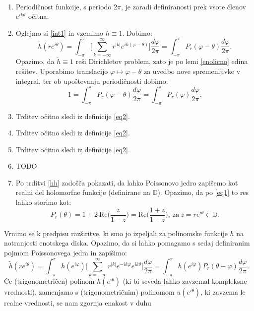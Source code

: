 \documentclass[mat1]{fmfdelo}
\begin{document}
    \begin{dokaz}
        $ $
        \begin{enumerate}
            \item Periodičnost funkcije, s periodo $2\pi$, je zaradi definiranosti prek vsote členov $e^{ik\theta}$ očitna. 
            \item Oglejmo si \ref{int1} in vzemimo $h \equiv 1$. Dobimo: 
            $$
                \widetilde{h}(r e^{i \theta}) = \int_{-\pi}^{\pi}{\bigg[\sum_{k=-\infty}^{\infty}{r^{|k|} e^{ik(\varphi - \theta)}}\bigg] \frac{d \varphi}{2 \pi}} = \int_{-\pi}^{\pi}{P_r(\varphi - \theta)\frac{d \varphi}{2 \pi}}. 
            $$
            Opazimo, da $\widetilde{h} \equiv 1$ reši Dirichletov problem, zato je po lemi \ref{enolicno} edina rešitev. Uporabimo translacijo $\varphi \mapsto \varphi - \theta$ za uvedbo nove spremenljivke v integral, ter ob upoštevanju periodičnosti dobimo:
            $$
                1 = \int_{-\pi}^{\pi}{P_r(\varphi - \theta)\frac{d \varphi}{2 \pi}} = \int_{-\pi}^{\pi}{P_r(\varphi)\frac{d \varphi}{2 \pi}}.
            $$
            \item Trditev očitno sledi iz definicije \ref{eq2}. 
            \item Trditev očitno sledi iz definicije \ref{eq2}. 
            \item Trditev očitno sledi iz definicije \ref{eq2}. 
            \item TODO 
            \item Po trditvi \ref{hh} zadošča pokazati, da lahko Poissonovo jedro zapišemo kot realni del holomorfne funkcije (definirane na $\mathbb{D}$). Opazimo, da po \ref{eq1} to res lahko storimo kot:
            $$
                P_r(\theta) = 1 + 2~\text{Re}\bigg(\frac{z}{1-z}\bigg) = \text{Re}\bigg(\frac{1+z}{1-z}\bigg),~\text{za}~z= re^{i\theta} \in \mathbb{D}.
            $$
        \end{enumerate}
    \end{dokaz}
    Vrnimo se k predpisu razširitve, ki smo jo izpeljali za polinomske funkcije $h$ na notranjosti enotskega diska. Opazimo, da si lahko pomagamo s sedaj definiranim pojmom Poissonovega jedra in zapišimo:
    $$
    \widetilde{h}(r e^{i \theta}) = \int_{-\pi}^{\pi}{h(e^{i \varphi}) \bigg[\sum_{k = - \infty}^{\infty} r^{|k|} e^{- i k \varphi} e^{i k \theta}} \bigg]\frac{d \varphi}{2 \pi} = 
    \int_{-\pi}^{\pi}{h(e^{i \varphi}) P_r(\theta - \varphi)\frac{d \varphi}{2 \pi}}.
    $$
    Če (trigonometričen) polinom $h(e^{i\theta})$ (ki  bi seveda lahko zavzemal kompleksne vrednosti), zamenjamo s (trigonometričnim) polinomom $u(e^{i\theta})$, ki zavzema le realne vrednosti, se nam zgornja enakost v duhu 
\end{document}
